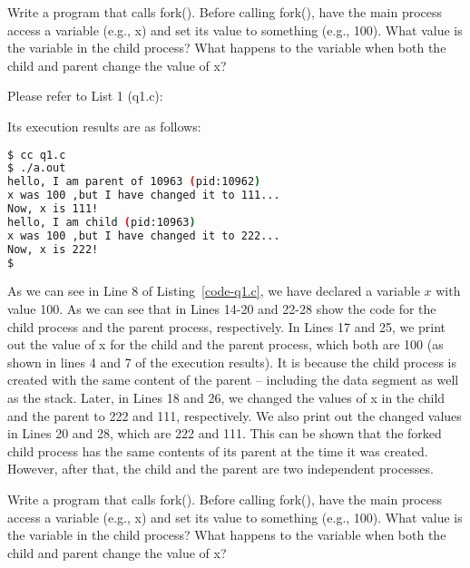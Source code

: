 \documentclass[10pt, answers]{exam}
\begin{document}

\begin{questions} 
\setcounter{question}{0} 

\question 
Write a program that calls fork(). Before calling fork(), have the main process access a variable (e.g., x) and set its value to something (e.g., 100). What value is the variable in the child process? What happens to the variable when both the child and parent change the value of x?

\begin{solution}
Please refer to List 1 (q1.c):



Its execution results are as follows:

\begin{lstlisting}[language=bash]
$ cc q1.c
$ ./a.out 
hello, I am parent of 10963 (pid:10962)
x was 100 ,but I have changed it to 111...
Now, x is 111!
hello, I am child (pid:10963)
x was 100 ,but I have changed it to 222...
Now, x is 222!
$
\end{lstlisting}

As we can see in Line 8 of Listing~\ref{code-q1.c}, we have declared a variable $x$ with value 100. As we can see that in Lines 14-20 and 22-28 show the code for the child process and the parent process, respectively. In Lines 17 and 25, we print out the value of x for the child and the parent process, which both are 100 (as shown in lines 4 and 7 of the execution results). It is because the child process is created with the same content of the parent -- including the data segment as well as the stack. Later, in Lines 18 and 26, we changed the values of x in the child and the parent to 222 and 111, respectively. We also print out the changed values in Lines 20 and 28, which are 222 and 111. This can be shown that the forked child process has the same contents of its parent at the time it was created. However, after that, the child and the parent are two independent processes.



\end{solution}


\question
Write a program that calls fork(). Before calling fork(), have the main process access a variable (e.g., x) and set its value to something (e.g., 100). What value is the variable in the child process? What happens to the variable when both the child and parent change the value of x?


\end{questions}
\end{document}

